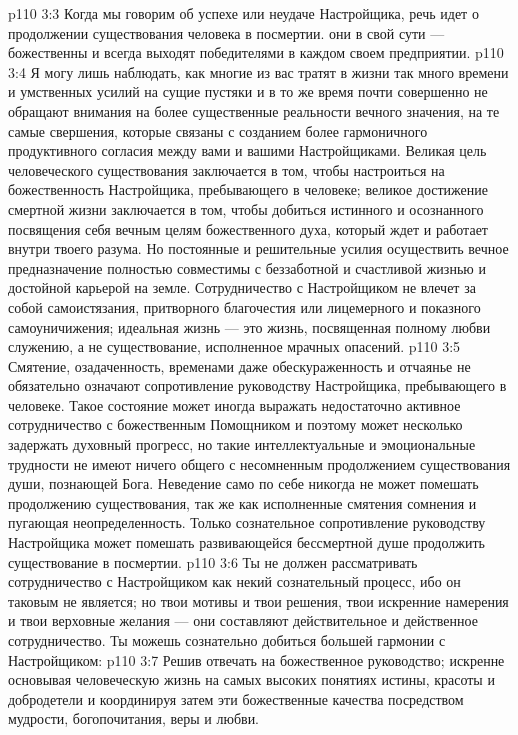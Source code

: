 \vs p110 3:3 Когда мы говорим об успехе или неудаче Настройщика, речь идет о продолжении существования человека в посмертии.  они в свой сути --- божественны и всегда выходят победителями в каждом своем предприятии.
\vs p110 3:4 \pc Я могу лишь наблюдать, как многие из вас тратят в жизни так много времени и умственных усилий на сущие пустяки и в то же время почти совершенно не обращают внимания на более существенные реальности вечного значения, на те самые свершения, которые связаны с созданием более гармоничного продуктивного согласия между вами и вашими Настройщиками. Великая цель человеческого существования заключается в том, чтобы настроиться на божественность Настройщика, пребывающего в человеке; великое достижение смертной жизни заключается в том, чтобы добиться истинного и осознанного посвящения себя вечным целям божественного духа, который ждет и работает внутри твоего разума. Но постоянные и решительные усилия осуществить вечное предназначение полностью совместимы с беззаботной и счастливой жизнью и достойной карьерой на земле. Сотрудничество с Настройщиком не влечет за собой самоистязания, притворного благочестия или лицемерного и показного самоуничижения; идеальная жизнь --- это жизнь, посвященная полному любви служению, а не существование, исполненное мрачных опасений.
\vs p110 3:5 \pc Смятение, озадаченность, временами даже обескураженность и отчаянье не обязательно означают сопротивление руководству Настройщика, пребывающего в человеке. Такое состояние может иногда выражать недостаточно активное сотрудничество с божественным Помощником и поэтому может несколько задержать духовный прогресс, но такие интеллектуальные и эмоциональные трудности не имеют ничего общего с несомненным продолжением существования души, познающей Бога. Неведение само по себе никогда не может помешать продолжению существования, так же как исполненные смятения сомнения и пугающая неопределенность. Только сознательное сопротивление руководству Настройщика может помешать развивающейся бессмертной душе продолжить существование в посмертии.
\vs p110 3:6 Ты не должен рассматривать сотрудничество с Настройщиком как некий сознательный процесс, ибо он таковым не является; но твои мотивы и твои решения, твои искренние намерения и твои верховные желания --- они составляют действительное и действенное сотрудничество. Ты можешь сознательно добиться большей гармонии с Настройщиком:
\vs p110 3:7 \bibnobreakspace Решив отвечать на божественное руководство; искренне основывая человеческую жизнь на самых высоких понятиях истины, красоты и добродетели и координируя затем эти божественные качества посредством мудрости, богопочитания, веры и любви.
